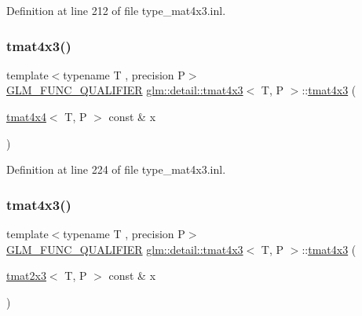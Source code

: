 Definition at line 212 of file type\+\_\+mat4x3.\+inl.

\mbox{\label{structglm_1_1detail_1_1tmat4x3_a0d72a5bed85447feb7f6416d065df322}} 
\subsubsection{\texorpdfstring{tmat4x3()}{tmat4x3()}\hspace{0.1cm}{\footnotesize\ttfamily [13/22]}}
{\footnotesize\ttfamily template$<$typename T , precision P$>$ \\
\hyperlink{setup_8hpp_a33fdea6f91c5f834105f7415e2a64407}{G\+L\+M\+\_\+\+F\+U\+N\+C\+\_\+\+Q\+U\+A\+L\+I\+F\+I\+ER} \hyperlink{structglm_1_1detail_1_1tmat4x3}{glm\+::detail\+::tmat4x3}$<$ T, P $>$\+::\hyperlink{structglm_1_1detail_1_1tmat4x3}{tmat4x3} (\begin{DoxyParamCaption}\item[{\hyperlink{structglm_1_1detail_1_1tmat4x4}{tmat4x4}$<$ T, P $>$ const \&}]{x }\end{DoxyParamCaption})\hspace{0.3cm}{\ttfamily [explicit]}}



Definition at line 224 of file type\+\_\+mat4x3.\+inl.

\mbox{\label{structglm_1_1detail_1_1tmat4x3_aaab7092c46080032688812c64e70a216}} 
\subsubsection{\texorpdfstring{tmat4x3()}{tmat4x3()}\hspace{0.1cm}{\footnotesize\ttfamily [14/22]}}
{\footnotesize\ttfamily template$<$typename T , precision P$>$ \\
\hyperlink{setup_8hpp_a33fdea6f91c5f834105f7415e2a64407}{G\+L\+M\+\_\+\+F\+U\+N\+C\+\_\+\+Q\+U\+A\+L\+I\+F\+I\+ER} \hyperlink{structglm_1_1detail_1_1tmat4x3}{glm\+::detail\+::tmat4x3}$<$ T, P $>$\+::\hyperlink{structglm_1_1detail_1_1tmat4x3}{tmat4x3} (\begin{DoxyParamCaption}\item[{\hyperlink{structglm_1_1detail_1_1tmat2x3}{tmat2x3}$<$ T, P $>$ const \&}]{x }\end{DoxyParamCaption})\hspace{0.3cm}{\ttfamily [explicit]}}



